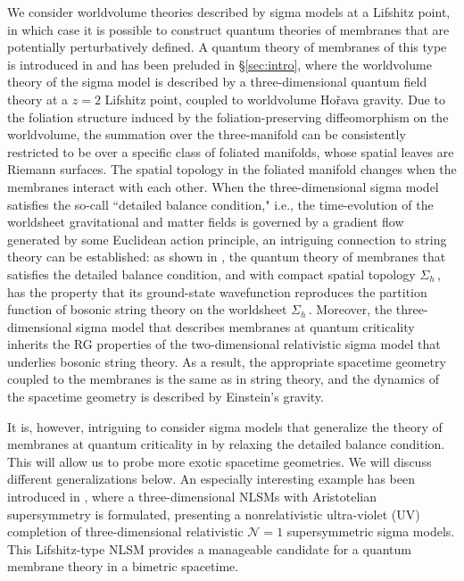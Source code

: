 \documentclass[11pt]{article}
\newcommand{\CN}{\mathcal{N}}
\begin{document}
We consider worldvolume theories described by sigma models at a Lifshitz point, in which case it is possible to construct quantum theories of membranes that are potentially perturbatively defined. A quantum theory of membranes of this type is introduced in \cite{Horava:2008ih} and has been preluded in \S\ref{sec:intro}, where the worldvolume theory of the sigma model is described by a three-dimensional quantum field theory at a $z=2$ Lifshitz point, coupled to worldvolume Ho\v{r}ava gravity. Due to the foliation structure induced by the foliation-preserving diffeomorphism on the worldvolume, the summation over the three-manifold can be consistently restricted to be over a specific class of foliated manifolds, whose spatial leaves are Riemann surfaces. The spatial topology in the foliated manifold changes when the membranes interact with each other.  When the three-dimensional sigma model satisfies the so-call ``detailed balance condition," i.e., the time-evolution of the worldsheet gravitational and matter fields is governed by a gradient flow generated by some Euclidean action principle, an intriguing connection to string theory can be established: as shown in \cite{Horava:2008ih}, the quantum theory of membranes that satisfies the detailed balance condition, and with compact spatial topology $\Sigma_h$\,, has the property that its ground-state wavefunction reproduces the partition function of bosonic string theory on the worldsheet $\Sigma_h$\,. Moreover, the three-dimensional sigma model that describes membranes at quantum criticality inherits the RG properties of the two-dimensional relativistic sigma model that underlies bosonic string theory. As a result, the appropriate spacetime geometry coupled to the membranes is the same as in string theory, and the dynamics of the spacetime geometry is described by Einstein's gravity.
 
It is, however, intriguing to consider sigma models that generalize the theory of membranes at quantum criticality in \cite{Horava:2008ih} by relaxing the detailed balance condition. This will allow us to probe more exotic spacetime geometries. We will discuss different generalizations below. An especially interesting example has been introduced in \cite{ssl, as}, where a three-dimensional NLSMs with Aristotelian supersymmetry is formulated, presenting a nonrelativistic ultra-violet (UV) completion of three-dimensional relativistic $\CN=1$ supersymmetric sigma models. This Lifshitz-type NLSM provides a manageable candidate for a quantum membrane theory in a bimetric spacetime. 
\end{document}
